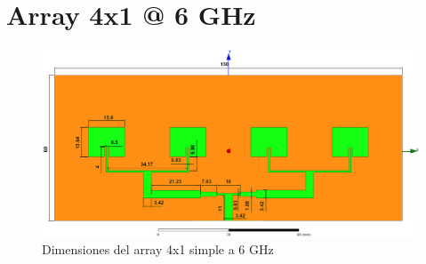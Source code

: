 \section{Array 4x1 @ 6 GHz}
\vfill
\begin{figure}[H]
   	 \centering
        \includegraphics[width=20cm ,height=\textheight, keepaspectratio=true, angle=90,origin=c]{archivos/desarrollo/autocad/6}
        \caption{Dimensiones del array 4x1 simple a 6 GHz}
        \label{fig:4x12}
\end{figure}
\vfill
\newpage